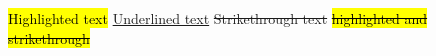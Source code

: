 \documentclass{article}
\begin{document}
\hl{Highlighted text} %
\ul{Underlined text} %
\st{Strikethrough text} %
\hl{\st{highlighted and strikethrough}}
\end{document}
